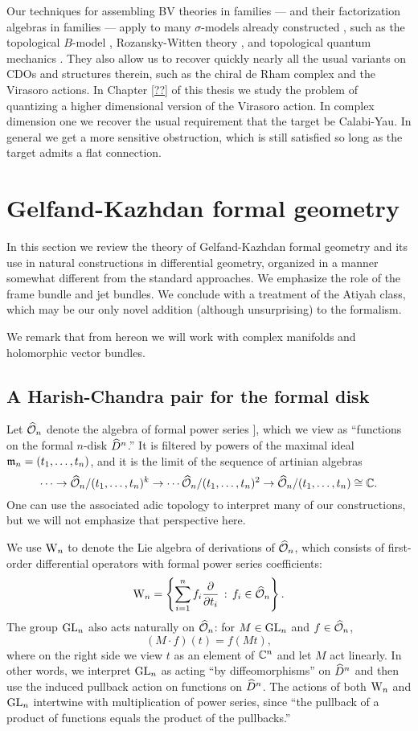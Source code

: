 \documentclass[10pt]{amsart}
\begin{document}
Our techniques for assembling BV theories in families --- and their factorization algebras in families --- apply to many $\sigma$-models already constructed , such as the topological $B$-model \cite{LiLi}, Rozansky-Witten theory \cite{CLL}, and topological quantum mechanics \cite{GG1, GLL}. 
They also allow us to recover quickly nearly all the usual variants on CDOs and structures therein, such as the chiral de Rham complex and the Virasoro actions.
In Chapter \ref{??} of this thesis we study the problem of quantizing a higher dimensional version of the Virasoro action. 
In complex dimension one we recover the usual requirement that the target be Calabi-Yau. 
In general we get a more sensitive obstruction, which is still satisfied so long as the target admits a flat connection.



\section{Gelfand-Kazhdan formal geometry}

In this section we review the theory of Gelfand-Kazhdan formal geometry and its use in natural constructions in differential geometry, organized in a manner somewhat different from the standard approaches.
We emphasize the role of the frame bundle and jet bundles.
We conclude with a treatment of the Atiyah class, which may be our only novel addition (although unsurprising) to the formalism.

We remark that from hereon we will work with complex manifolds and holomorphic vector bundles.
 
\subsection{A Harish-Chandra pair for the formal disk}

Let $\widehat{\mathcal O}_n$ denote the algebra of formal power series 
\ben
\CC [[ t_1,\ldots,t_n ]],
\een 
which we view as ``functions on the formal $n$-disk $\widehat{D}^n$.'' 
It is filtered by powers of the maximal ideal ${\mathfrak m}_n = (t_1,\ldots,t_n)$, and it is the limit of the sequence of artinian algebras
\[
\cdots \to \widehat{\mathcal O}_n/(t_1,\ldots,t_n)^k \to \cdots \widehat{\mathcal O}_n/(t_1,\ldots,t_n)^2 \to \widehat{\mathcal O}_n/(t_1,\ldots,t_n) \cong \mathbb C.
\] 
One can use the associated adic topology to interpret many of our constructions, but we will not emphasize that perspective here.

We use ${{\rm W}_n}$ to denote the Lie algebra of derivations of $\widehat{\mathcal O}_n$, which consists of first-order differential operators with formal power series coefficients:
\[
{{\rm W}_n} = \left\{ \sum_{i =1 }^n f_i \frac{\partial}{\partial t_i} \,:\, f_i \in \widehat{\mathcal O}_n\right\}.
\]
The group ${\rm GL}_n$ also acts naturally on $\widehat{\mathcal O}_n$: for $M \in {\rm GL}_n$ and $f \in \widehat{\mathcal O}_n$,
\[
(M \cdot f)(t) = f (Mt),
\]
where on the right side we view $t$ as an element of $\mathbb C^n$ and let $M$ act linearly.
In other words, we interpret ${\rm GL}_n$ as acting ``by diffeomorphisms'' on $\widehat{D}^n$ and then use the induced pullback action on functions on $\widehat{D}^n$.
The actions of both ${{\rm W}_n}$ and ${\rm GL}_n$ intertwine with multiplication of power series, 
since ``the pullback of a product of functions equals the product of the pullbacks.''
\end{document}
